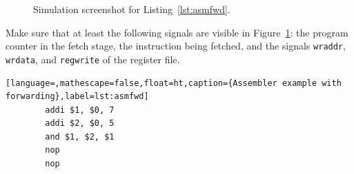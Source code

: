 
\begin{figure}[ht!]
  \centering

  \caption{Simulation screenshot for Listing~\ref{lst:asmfwd}.}
  \label{fig:sim1}
\end{figure}

Make sure that at least the following signals are visible in
Figure~\ref{fig:sim1}: the program counter in the fetch stage, the
instruction being fetched, and the signals \texttt{wraddr},
\texttt{wrdata}, and \texttt{regwrite} of the register file.

\begin{lstlisting}[language=,mathescape=false,float=ht,caption={Assembler example with forwarding},label=lst:asmfwd]
        addi $1, $0, 7
        addi $2, $0, 5
        and $1, $2, $1
        nop
        nop
\end{lstlisting}
